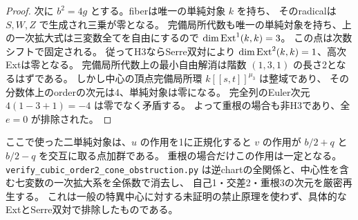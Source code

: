 \begin{proof}
次に $b^2=4g$ とする。fiberは唯一の単純対象 $k$ を持ち、
そのradicalは $S,W,Z$ で生成され三乗が零となる。
完備局所代数も唯一の単純対象を持ち、上の一次拡大式は三変数全てを自由にするので
$\dim\operatorname{Ext}^1(k,k)=3$。
この点は次数シフトで固定される。
従ってH3ならSerre双対により $\dim\operatorname{Ext}^2(k,k)=1$、高次Extは零となる。
完備局所代数上の最小自由解消は階数 $(1,3,1)$ の長さ2となるはずである。
しかし中心の頂点完備局所環 $k[[s,t]]^{\mu_3}$ は整域であり、
その分数体上のorderの次元は4、単純対象は零になる。
完全列のEuler次元 $4(1-3+1)=-4$ は零でなく矛盾する。
よって重根の場合も非H3であり、全 $e=0$ が排除された。
\end{proof}
ここで使った二単純対象は、$u$ の作用を1に正規化すると
$v$ の作用が $b/2+q$ と $b/2-q$ を交互に取る点加群である。
重根の場合だけこの作用は一定となる。
\texttt{verify\_\allowbreak{}cubic\_\allowbreak{}order2\_\allowbreak{}cone\_\allowbreak{}obstruction.py}
は逆chartの全関係と、中心性を含む七変数の一次拡大系を全係数で消去し、
自己1・交差2・重根3の次元を厳密再生する。
これは一般の特異中心に対する未証明の禁止原理を使わず、具体的なExtとSerre双対で排除したものである。

